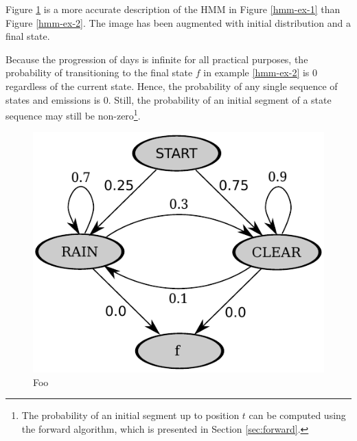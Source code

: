Figure \ref{hmm-ex-3} is a more accurate description of the HMM in
Figure \ref{hmm-ex-1} than Figure \ref{hmm-ex-2}. The image has been
augmented with initial distribution and a final state. 

Because the progression of days is infinite for all practical purposes, the
probability of transitioning to the final state $f$ in example
\ref{hmm-ex-2} is 0 regardless of the current state. Hence, the
probability of any single sequence of states and emissions is
0. Still, the probability of an initial segment of a state sequence
may still be non-zero\footnote{The probability of an initial segment
  up to position $t$ can be computed using the forward algorithm,
  which is presented in Section \ref{sec:forward}.}.%

\begin{figure}[!htb]
\begin{center}
\caption{Foo}\label{hmm-ex-3}
\includegraphics[scale=0.8]{hmm-ex-graph-2}
\end{center}
\end{figure}


